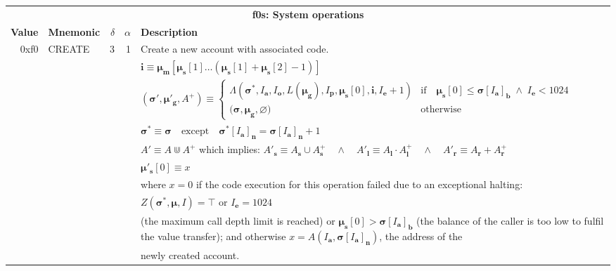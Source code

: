 \documentclass[9pt,oneside]{amsart}
\begin{document}
\begin{tabularx}{\textwidth}{rlrrX}
\toprule
\multicolumn{5}{c}{\textbf{f0s: System operations}} \vspace{5pt} \\
\textbf{Value} & \textbf{Mnemonic} & $\delta$ & $\alpha$ & \textbf{Description} \vspace{5pt} \\
0xf0 & {\small CREATE} & 3 & 1 & Create a new account with associated code. \\
&&&& $\mathbf{i} \equiv \boldsymbol{\mu}_\mathbf{m}[ \boldsymbol{\mu}_\mathbf{s}[1] \dots (\boldsymbol{\mu}_\mathbf{s}[1] + \boldsymbol{\mu}_\mathbf{s}[2] - 1) ]$ \\
&&&& $(\boldsymbol{\sigma}', \boldsymbol{\mu}'_\mathbf{g}, A^+) \equiv \begin{cases}\Lambda(\boldsymbol{\sigma}^*, I_\mathbf{a}, I_\mathbf{o}, L(\boldsymbol{\mu}_\mathbf{g}), I_\mathbf{p}, \boldsymbol{\mu}_\mathbf{s}[0], \mathbf{i}, I_\mathbf{e} + 1) & \text{if} \quad \boldsymbol{\mu}_\mathbf{s}[0] \leqslant \boldsymbol{\sigma}[I_\mathbf{a}]_\mathbf{b} \;\wedge\; I_\mathbf{e} < 1024\\ \big(\boldsymbol{\sigma}, \boldsymbol{\mu}_\mathbf{g}, \varnothing\big) & \text{otherwise} \end{cases}$ \\
&&&& $\boldsymbol{\sigma}^* \equiv \boldsymbol{\sigma} \quad \text{except} \quad \boldsymbol{\sigma}^*[I_\mathbf{a}]_\mathbf{n} = \boldsymbol{\sigma}[I_\mathbf{a}]_\mathbf{n} + 1$ \\
&&&& $A' \equiv A \Cup A^+$ which implies: $A'_\mathbf{s} \equiv A_\mathbf{s} \cup A^+_\mathbf{s} \quad \wedge \quad A'_\mathbf{l} \equiv A_\mathbf{l} \cdot A^+_\mathbf{l} \quad \wedge \quad A'_\mathbf{r} \equiv A_\mathbf{r} + A^+_\mathbf{r}$ \\
&&&& $\boldsymbol{\mu}'_\mathbf{s}[0] \equiv x$ \\
&&&& where $x=0$ if the code execution for this operation failed due to an exceptional halting: \\
&&&& $Z(\boldsymbol{\sigma}^*, \boldsymbol{\mu}, I) = \top$ or $I_\mathbf{e} = 1024$ \\
&&&& (the maximum call depth limit is reached) or $\boldsymbol{\mu}_\mathbf{s}[0] > \boldsymbol{\sigma}[I_\mathbf{a}]_\mathbf{b}$ (the balance of the caller is too low to fulfil the value transfer); and otherwise $x=A(I_\mathbf{a}, \boldsymbol{\sigma}[I_\mathbf{a}]_\mathbf{n})$, the address of the  \\
&&&& newly created account. \\

\end{tabularx}
\end{document}
